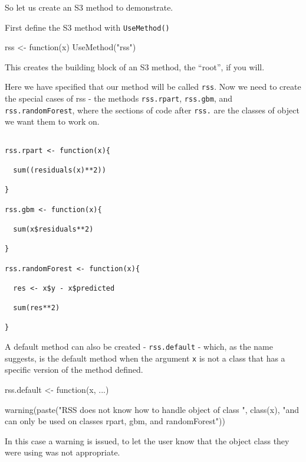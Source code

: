 So let us create an S3 method to demonstrate.

First define the S3 method with \texttt{UseMethod()}

\begin{Schunk}
\begin{Sinput}
rss <- function(x) UseMethod("rss")
\end{Sinput}
\end{Schunk}

This creates the building block of an S3 method, the ``root'', if you
will.

Here we have specified that our method will be called \texttt{rss}. Now
we need to create the special cases of rss - the methods
\texttt{rss.rpart}, \texttt{rss.gbm}, and \texttt{rss.randomForest},
where the sections of code after \texttt{rss.} are the classes of object
we want them to work on.

\begin{verbatim}

rss.rpart <- function(x){
  
  sum((residuals(x)**2))
  
}

rss.gbm <- function(x){
  
  sum(x$residuals**2)
 
}

rss.randomForest <- function(x){

  res <- x$y - x$predicted  
  
  sum(res**2)  
    
}
\end{verbatim}

A default method can also be created - \texttt{rss.default} - which, as
the name suggests, is the default method when the argument \texttt{x} is
not a class that has a specific version of the method defined.

\begin{Schunk}
\begin{Sinput}
rss.default <- function(x, ...){
  
  warning(paste("RSS does not know how to handle object of class ", 
                class(x), 
                "and can only be used on classes rpart, gbm, and randomForest"))
          
          }
\end{Sinput}
\end{Schunk}

In this case a warning is issued, to let the user know that the object
class they were using was not appropriate.

